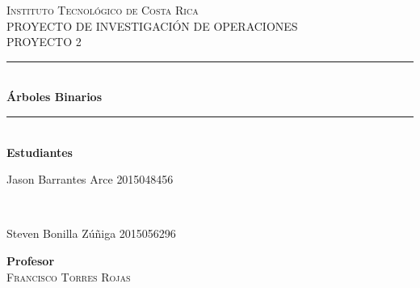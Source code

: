 \documentclass[10pt,letterpaper]{article}
\begin{document}
 
    \begin{titlepage} 
    \newcommand{\HRule}{\rule{\linewidth}{0.5mm}} 
    \center   
    \textsc{\Huge Instituto Tecnológico de Costa Rica}\\[1.5cm] 
    \textsc{\normalsize PROYECTO DE INVESTIGACIÓN DE OPERACIONES}\\[0.5cm] 
    \textsc{\normalsize PROYECTO 2}\\[0.5cm] 
    \HRule\\[0.4cm] 
    {\huge\bfseries \vspace{1cm} Árboles Binarios}\\[0.4cm] 
    \HRule\\[2cm] 
    \textbf{\Large Estudiantes}\\[0.5cm] 
        \begin{minipage}{0.4\textwidth} 
        \begin{flushleft} 
            \large 
            Jason Barrantes Arce 
            \textsc{2015048456} 
        \end{flushleft} 
    \end{minipage} 
    ~ 
    \begin{minipage}{0.4\textwidth} 
        \begin{flushright} 
           	\large 
            Steven Bonilla Zúñiga 
            \textsc{2015056296} 
        \end{flushright} 
    \end{minipage} 
   \newline \newline 
   \newline  
   \textbf{\Large Profesor}\\[0.5cm] 
    \textsc{\normalsize Francisco Torres Rojas}\\[0.5cm] 
    \end{titlepage} 
    
\end{document}
